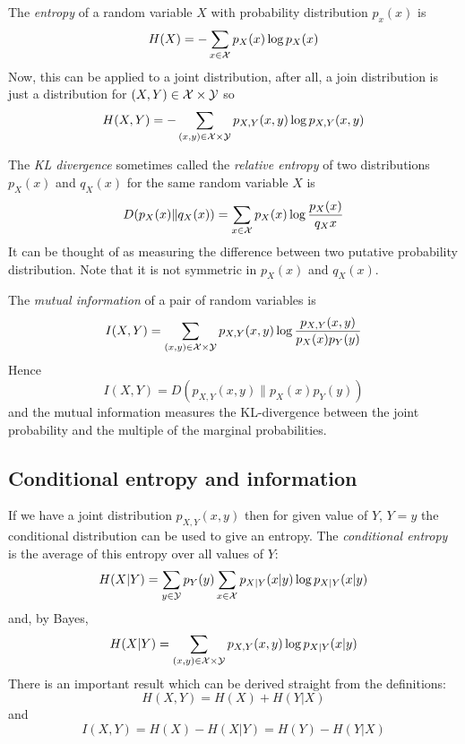 \documentclass[12pt]{article}
\begin{document}
The {\sl entropy} of a random variable $X$ with probability distribution $p_x(x)$ is
\begin{equation}
H(X)=-\sum_{x\in{\cal X}}p_X(x)\log{p_X(x)}
\end{equation}
Now, this can be applied to a joint distribution, after all, a join distribution is just a distribution for $(X,Y)\in {\cal X}\times{\cal Y}$ so
\begin{equation}
H(X,Y)=-\sum_{(x,y)\in{\cal X}\times {\cal Y}}p_{X,Y}(x,y)\log{p_{X,Y}(x,y)}
\end{equation}

The {\sl KL divergence} sometimes called the {\sl relative entropy} of two distributions $p_X(x)$ and $q_X(x)$ for the same random variable $X$ is
\begin{equation}
D(p_X(x)\|q_X(x))=\sum_{x\in{\cal X}}p_X(x)\log\frac{p_X(x)}{q_X{x}}
\end{equation}
It can be thought of as measuring the difference between two putative probability distribution. Note that it is not symmetric in $p_X(x)$ and $q_X(x)$.

The {\sl mutual information} of a pair of random variables is
\begin{equation}
I(X,Y)=\sum_{(x,y)\in{\cal X}\times{\cal Y}}p_{X,Y}(x,y)\log{\frac{p_{X,Y}(x,y)}{p_X(x)p_Y(y)}}
\end{equation}
Hence
\begin{equation}
I(X,Y)=D(p_{X,Y}(x,y)\|p_X(x)p_Y(y))
\end{equation}
and the mutual information measures the KL-divergence between the joint probability and the multiple of the marginal probabilities.

\subsection*{Conditional entropy and information}

If we have a joint distribution $p_{X,Y}(x,y)$ then for given value of $Y$, $Y=y$ the conditional distribution can be used to give an entropy. The {\sl conditional entropy} is the average of this entropy over all values of $Y$:
\begin{equation}
H(X|Y)=\sum_{y\in {\cal Y}}p_Y(y)\sum_{x\in {\cal X}} p_{X|Y}(x|y)\log p_{X|Y}(x|y)
\end{equation}
and, by Bayes,                                   
\begin{equation}
H(X|Y)=\sum_{(x,y)\in {\cal X}\times{\cal Y}}p_{X,Y}(x,y)\log p_{X|Y}(x|y)
\end{equation}
There is an important result which can be derived straight from the definitions:
\begin{equation}
H(X,Y)=H(X)+H(Y|X)
\end{equation}
and
\begin{equation}
I(X,Y)=H(X)-H(X|Y)=H(Y)-H(Y|X)
\end{equation}
\end{document}
